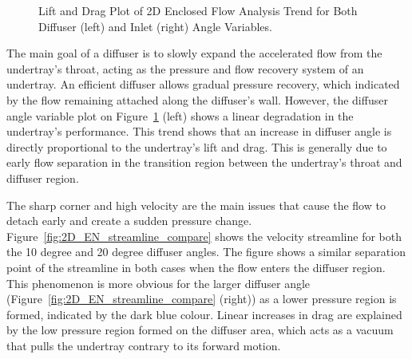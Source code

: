 \begin{figure}[!ht]
  \noindent
  \caption{Lift and Drag Plot of 2D Enclosed Flow Analysis Trend for Both Diffuser (left) and Inlet (right) Angle Variables.}
  \label{fig:2D_EN_result}
\end{figure}

\noindent The main goal of a diffuser is to slowly expand the accelerated flow from the undertray's throat, acting as the pressure and flow recovery system of an undertray. An efficient diffuser allows gradual pressure recovery, which indicated by the flow remaining attached along the diffuser's wall. However, the diffuser angle variable plot on Figure~\ref{fig:2D_EN_result} (left) shows a linear degradation in the undertray's performance. This trend shows that an increase in diffuser angle is directly proportional to the undertray's lift and drag. This is generally due to early flow separation in the transition region between the undertray's throat and diffuser region. 

\noindent The sharp corner and high velocity are the main issues that cause the flow to detach early and create a sudden pressure change. Figure~\ref{fig:2D_EN_streamline_compare} shows the velocity streamline for both the 10 degree and 20 degree diffuser angles. The figure shows a similar separation point of the streamline in both cases when the flow enters the diffuser region. This phenomenon is more obvious for the larger diffuser angle (Figure~\ref{fig:2D_EN_streamline_compare} (right)) as a lower pressure region is formed, indicated by the dark blue colour. Linear increases in drag are explained by the low pressure region formed on the diffuser area, which acts as a vacuum that pulls the undertray contrary to its forward motion.  

